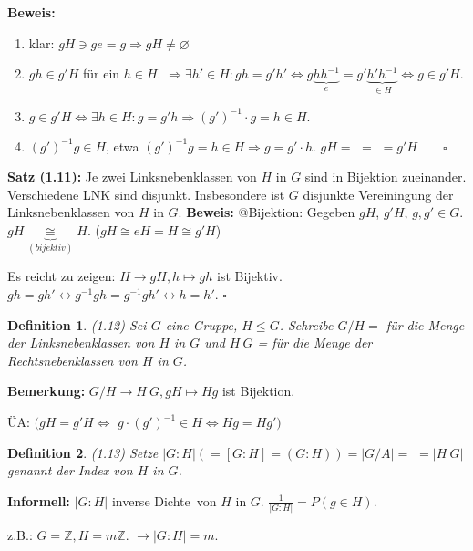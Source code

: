 \documentclass[10pt,a4paper]{article}
\newtheorem{defi}{Definition}
\begin{document}
\textbf{Beweis:}
\begin{enumerate}
\item klar: $gH \ni ge = g \Rightarrow gH \neq \varnothing$
\item $gh \in g'H$ für ein $h \in H$. $\Rightarrow \exists h' \in H: gh = g' h' \Leftrightarrow g \underbrace{h h^{-1}}_{e} = g'\underbrace{h'h^{-1}}_{\in H} \Leftrightarrow g \in g'H$.
\item $g \in g'H \Leftrightarrow \exists h \in H: g = g'h \Rightarrow (g')^{-1} \cdot g = h \in H.$
\item $(g')^{-1} g \in H$, etwa $(g')^{-1}g = h \in H \Rightarrow g = g' \cdot h$. $gH = $ $=$  $= g'H\qquad\square$
\end{enumerate}

\textbf{Satz (1.11):} Je zwei Linksnebenklassen von $H$ in $G$ sind in Bijektion zueinander. Verschiedene LNK sind disjunkt. Insbesondere ist $G$ disjunkte Vereiningung der Linksnebenklassen von $H$ in $G$.
\textbf{Beweis:} @Bijektion: Gegeben $gH$, $g'H$, $g, g' \in G$. \\
$gH \underbrace{\cong}_{(bijektiv)} H$. ($gH \cong eH = H \cong g'H$)

Es reicht zu zeigen: $H \to gH, h \mapsto gh$ ist Bijektiv. $gh = gh' \leftrightarrow g^{-1}gh = g^{-1}gh' \leftrightarrow h = h'$. $\square$

\begin{defi} (1.12)
Sei $G$ eine Gruppe, $H \leqslant G$. Schreibe $G / H = $  für die Menge der Linksnebenklassen von $H$ in $G$ und $H \ G$ =  für die Menge der Rechtsnebenklassen von $H$ in $G$.
\end{defi}

\textbf{Bemerkung:} $G / H \to H \ G, gH \mapsto Hg$ ist Bijektion.

ÜA: $(gH = g'H \Leftrightarrow$ %
$g \cdot (g')^{-1} \in H \Leftrightarrow Hg = Hg')$

\begin{defi} (1.13)
Setze $\vert G : H\vert (= [G:H] = (G:H)) = \vert G / A\vert =$ %
$= \vert H \ G\vert$ genannt der \emph{Index} von $H$ in $G$. 
\end{defi}

\textbf{Informell:} $\vert G : H\vert$ \glqq inverse Dichte\grqq\ von $H$ in $G$. $\frac{1}{\vert G : H\vert} = $\glqq $ P(g \in H)$\grqq .

z.B.: $G = \mathbb{Z}, H = m \mathbb{Z}$. $\rightarrow \vert G : H\vert
 = m$.
 
\end{document}

